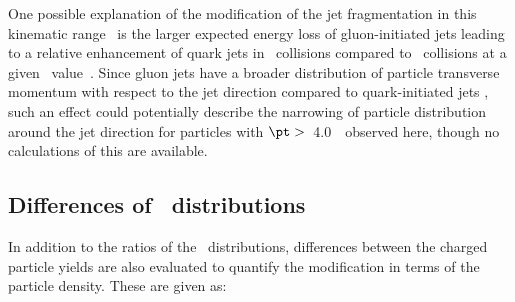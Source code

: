 One possible explanation of the modification of the 
jet fragmentation in this kinematic range~\cite{PhysRevC.98.024908} is the larger expected energy loss
of gluon-initiated jets leading to a relative enhancement of quark jets in \pbpb\ collisions compared
to \pp\ collisions at a given \ptjet\ value~\cite{Spousta:2015fca}. Since gluon jets have a broader distribution of particle transverse momentum with respect to the jet direction compared to quark-initiated jets \cite{OPAL:1995ab}
 , such an effect could potentially describe the narrowing of particle distribution around the jet direction for particles with $\pt >$~4.0~\GeV\
observed here, though no calculations of this are available.



\FloatBarrier


\subsection{Differences of \Dptr\ distributions}
In addition to the ratios of the \Dptr\ distributions, differences between the charged particle yields are also evaluated to quantify the modification in terms of the particle density. These are given as:

